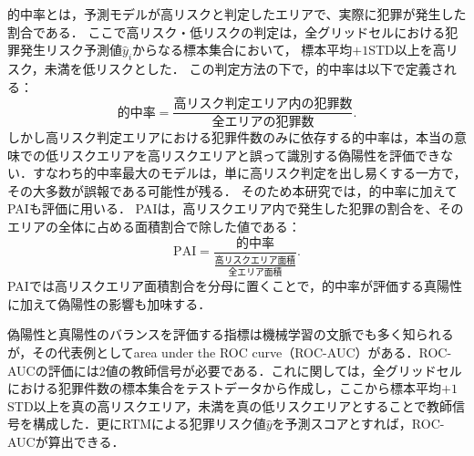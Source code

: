 的中率とは，予測モデルが高リスクと判定したエリアで、実際に犯罪が発生した割合である．
ここで高リスク・低リスクの判定は，全グリッドセルにおける犯罪発生リスク予測値$\hat y_i$からなる標本集合において，
標本平均$+1$STD以上を高リスク，未満を低リスクとした\cite{joshi2020considerationsdevelopingpredictivemodels, chainey2008utility}．
この判定方法の下で，的中率は以下で定義される：
\begin{equation}\label{hitrate}
  的中率=\frac{高リスク判定エリア内の犯罪数}{全エリアの犯罪数}.
\end{equation}
しかし高リスク判定エリアにおける犯罪件数のみに依存する的中率は，本当の意味での低リスクエリアを高リスクエリアと誤って識別する偽陽性を評価できない．すなわち的中率最大のモデルは，単に高リスク判定を出し易くする一方で，その大多数が誤報である可能性が残る．
%
そのため本研究では，的中率に加えてPAI\cite{chainey2008utility}も評価に用いる．
PAIは，高リスクエリア内で発生した犯罪の割合を、そのエリアの全体に占める面積割合で除した値である：
\begin{equation}\label{pai}
  \mathrm{PAI}=\frac{的中率}{\frac{高リスクエリア面積}{全エリア面積}}.
\end{equation}
PAIでは高リスクエリア面積割合を分母に置くことで，的中率が評価する真陽性に加えて偽陽性の影響も加味する．

偽陽性と真陽性のバランスを評価する指標は機械学習の文脈でも多く知られるが，その代表例としてarea under the ROC curve（ROC-AUC）がある\cite{islp}．ROC-AUCの評価には2値の教師信号が必要である．これに関しては，全グリッドセルにおける犯罪件数の標本集合をテストデータから作成し，ここから標本平均$+1$STD以上を真の高リスクエリア，未満を真の低リスクエリアとすることで教師信号を構成した．更にRTMによる犯罪リスク値$\hat y$を予測スコアとすれば，ROC-AUCが算出できる．

